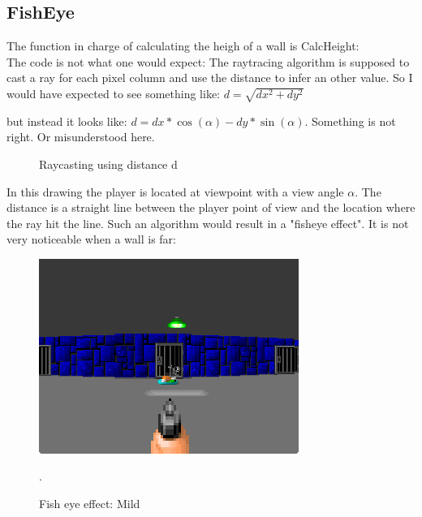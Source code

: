 \subsection{FishEye}
The function in charge of calculating the heigh of a wall is CalcHeight:\\



The code is not what one would expect: The raytracing algorithm is supposed to cast a ray for each pixel column and use the distance  to infer an other value. So I would have expected to see something like:
\begin{math}
	d = \sqrt{dx^2 + dy^2}
\end{math}

but instead it looks like:
\begin{math}
	d = dx * \cos(\alpha) - dy * \sin(\alpha)
\end{math}.
Something is not right. Or misunderstood here.
\begin{figure}[H]
\centering
 
 \caption{Raycasting using distance d} \label{fig:Raycasting2}
\end{figure}

In this drawing the player is located at viewpoint with a view angle \begin{math}\alpha\end{math}. The distance  is a straight line between the player point of view and the location where the ray hit the line. Such an algorithm would result in a "fisheye effect". It is not very noticeable when a wall is far:

\begin{figure}[H]
\centering
 \includegraphics[scale=1.3]{imgs/fish_eye/bad_mild.png}
 \caption{Fish eye effect: Mild}. \label{fig:mips}
 \end{figure}

